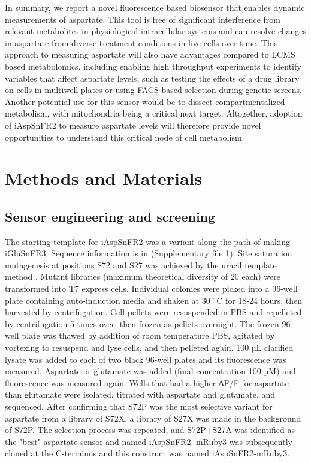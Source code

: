 \documentclass[9pt,lineno]{elife}
\begin{document}
In summary, we report a novel fluorescence based biosensor that enables dynamic measurements of aspartate.
This tool is free of significant interference from relevant metabolites in physiological intracellular systems and can resolve changes in aspartate from diverse treatment conditions in live cells over time.
This approach to measuring aspartate will also have advantages compared to LCMS based metabolomics, including enabling high throughput experiments to identify variables that affect aspartate levels, such as testing the effects of a drug library on cells in multiwell plates or using FACS based selection during genetic screens.
Another potential use for this sensor would be to dissect compartmentalized metabolism, with mitochondria being a critical next target.
Altogether, adoption of iAspSnFR2 to measure aspartate levels will therefore provide novel opportunities to understand this critical node of cell metabolism.



\section{Methods and Materials}

\subsection{Sensor engineering and screening}
The starting template for iAspSnFR2 was a variant along the path of making iGluSnFR3.
Sequence information is in (Supplementary file 1).
Site saturation mutagenesis at positions S72 and S27 was achieved by the uracil template method \citep{Kunkel1985-ev}.
Mutant libraries (maximum theoretical diversity of 20 each) were transformed into T7 express cells.
Individual colonies were picked into a 96-well plate containing auto-induction media \citep{Studier2005-ki} and shaken at 30˚C for 18-24 hours, then harvested by centrifugation.
Cell pellets were resuspended in PBS and repelleted by centrifugation 5 times over, then frozen as pellets overnight.
The frozen 96-well plate was thawed by addition of room temperature PBS, agitated by vortexing to resuspend and lyse cells, and then pelleted again.
100 µL clarified lysate was added to each of two black 96-well plates and its fluorescence was measured.
Aspartate or glutamate was added (final concentration 100 µM) and fluorescence was measured again.
Wells that had a higher ∆F/F for aspartate than glutamate were isolated, titrated with aspartate and glutamate, and sequenced.
After confirming that S72P was the most selective variant for aspartate from a library of S72X, a library of S27X was made in the background of S72P.
The selection process was repeated, and S72P+S27A was identified as the "best" aspartate sensor and named iAspSnFR2.
mRuby3 was subsequently cloned at the C-terminus and this construct was named iAspSnFR2-mRuby3.
\end{document}
